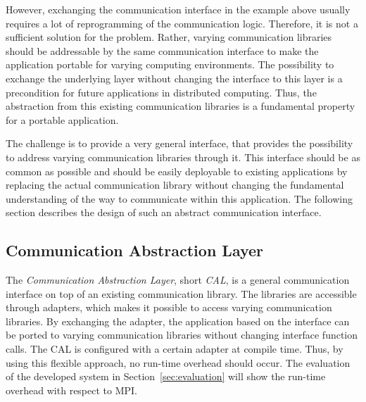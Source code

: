 However, exchanging the communication interface in the example above
usually requires a lot of reprogramming of the communication logic.
Therefore, it is not a sufficient solution for the problem.  Rather,
varying communication libraries should be addressable by the same
communication interface to make the application portable for varying
computing environments. The possibility to exchange the
underlying layer without changing the interface to this layer is a
precondition for future applications in distributed computing.  Thus,
the abstraction from this existing communication libraries is a
fundamental property for a portable application.

The challenge is to provide a very general interface, that provides
the possibility to address varying communication libraries through it.
This interface should be as common as possible and should be easily
deployable to existing applications by replacing the actual
communication library without changing the fundamental understanding
of the way to communicate within this application. The following
section describes the design of such an abstract communication
interface.


\subsection{Communication Abstraction Layer}
\label{sec:cal}

The \textit{Communication Abstraction Layer}, short \textit{CAL}, is a
general communication interface on top of an existing communication
library. The libraries are accessible through adapters, which makes it
possible to access varying communication libraries. By exchanging the
adapter, the application based on the interface can be ported to
varying communication libraries without changing interface function
calls. The CAL is configured with a certain adapter at compile
time. Thus, by using this flexible approach, no run-time overhead
should occur. The evaluation of the developed system in
Section~\ref{sec:evaluation} will show the run-time overhead with
respect to MPI.

